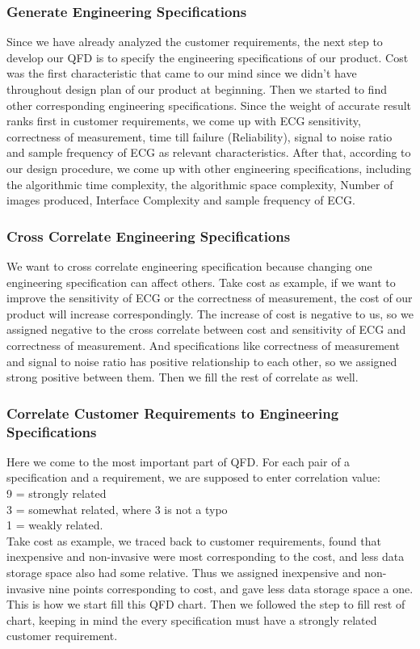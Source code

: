 \documentclass[paper=letter, fontsize=11pt]{scrartcl}
\numberwithin{equation}{section}		%
\numberwithin{figure}{section}			%
\numberwithin{table}{section}			%
\begin{document}
\subsubsection{Generate Engineering Specifications}
Since we have already analyzed the customer requirements, the next step to develop our QFD is to specify the engineering specifications of our product. Cost was the first characteristic that came to our mind since we didn't have throughout design plan of our product at beginning.  Then we started to find other corresponding engineering specifications. Since the weight of accurate result ranks first in customer requirements, we come up with ECG sensitivity, correctness of measurement, time till failure (Reliability), signal to noise ratio and sample frequency of ECG as relevant characteristics. After that, according to our design procedure, we come up with other engineering specifications, including the algorithmic time complexity, the algorithmic space complexity, Number of images produced, Interface Complexity and sample frequency of ECG.

\subsubsection{Cross Correlate Engineering Specifications}
We want to cross correlate engineering specification because changing one engineering specification can affect others. Take cost as example, if we want to improve the sensitivity of ECG or the correctness of measurement, the cost of our product will increase correspondingly. The increase of cost is negative to us, so we assigned negative to the cross correlate between cost and sensitivity of ECG and correctness of measurement. And specifications like correctness of measurement and signal to noise ratio has positive relationship to each other, so we assigned strong positive between them. Then we fill the rest of correlate as well.

\subsubsection{Correlate Customer Requirements to Engineering Specifications}
Here we come to the most important part of QFD. For each pair of a specification and a requirement, we are supposed to enter correlation value\cite{450}: \\
9 = strongly related \\
3 = somewhat related, where 3 is not a typo \\
1 = weakly related. \\
Take cost as example, we traced back to customer requirements, found that inexpensive and non-invasive were most corresponding to the cost, and less data storage space also had some relative. Thus we assigned inexpensive and non-invasive nine points corresponding to cost, and gave less data storage space a one. This is how we start fill this QFD chart. Then we followed the step to fill rest of chart, keeping in mind the every specification must have a strongly related customer requirement.
\end{document}
